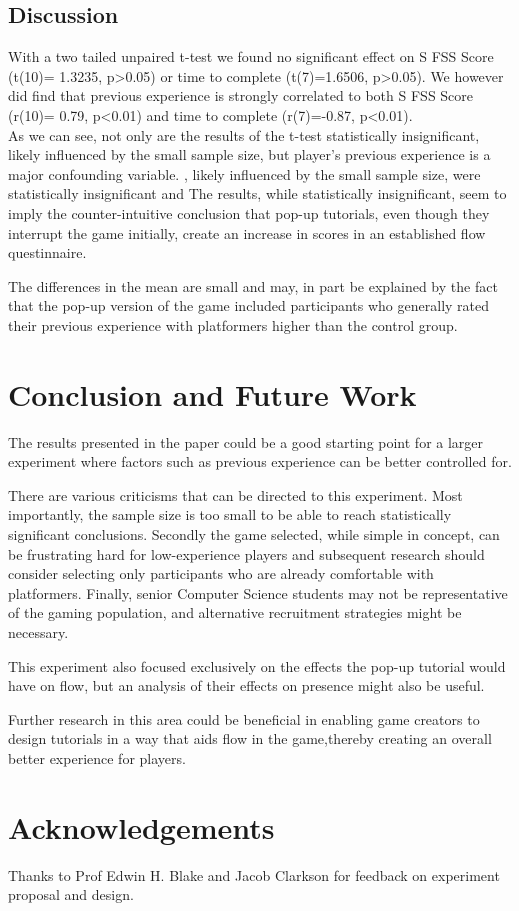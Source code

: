 \documentclass{acmsiggraph}
\begin{document}
\subsection{Discussion}
With a two tailed unpaired t-test we found no significant effect on S FSS Score (t(10)= 1.3235, p\textgreater  0.05) or time to complete (t(7)=1.6506, p\textgreater0.05). We however did find that previous experience is strongly correlated to both S FSS Score (r(10)= 0.79, p\textless0.01) and time to complete (r(7)=-0.87, p\textless0.01).\\
As we can see, not only are the results of the t-test statistically insignificant, likely influenced by the small sample size, but player's previous experience is a major confounding variable.
, likely influenced by the small sample size, were statistically insignificant and
The results, while statistically insignificant, seem to imply the counter-intuitive conclusion that pop-up tutorials, even though they interrupt the game initially, create an increase in scores in an established flow questinnaire.

The differences in the mean are small and may, in part be explained by the fact that the pop-up version of the game included participants who generally rated their previous experience with platformers higher than the control group. 

\section{Conclusion and Future Work}
The results presented in the paper could be a good starting point for a larger experiment where factors such as previous experience can be better controlled for.

There are various criticisms that can be directed to this experiment. Most importantly, the sample size is too small to be able to reach statistically significant conclusions. Secondly the game selected, while simple in concept, can be frustrating hard for low-experience players and subsequent research should consider selecting only participants who are already comfortable with platformers. Finally, senior Computer Science students may not be representative of the gaming population, and alternative recruitment strategies might be necessary.

This experiment also focused exclusively on the effects the pop-up tutorial would have on flow, but an analysis of their effects on presence might also be useful.

Further research in this area could be beneficial in enabling game creators to design tutorials in a way that aids flow in the game,thereby creating an overall better experience for players.

\section*{Acknowledgements}

Thanks to Prof Edwin H. Blake and Jacob Clarkson for feedback on experiment proposal and design.


\nocite{*}

\end{document}
